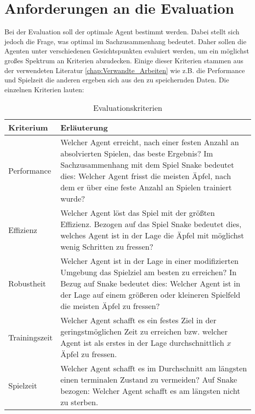 \section{Anforderungen an die Evaluation} \label{sec:Anforderungen_an_die_Evaluation}
Bei der Evaluation soll der optimale Agent bestimmt werden. Dabei stellt sich jedoch die Frage, was optimal im Sachzusammenhang bedeutet. 
Daher sollen die Agenten unter verschiedenen Gesichtspunkten evaluiert werden, um ein möglichst großes Spektrum an Kriterien abzudecken.
Einige dieser Kriterien stammen aus der verwendeten Literatur \ref{chap:Verwandte_Arbeiten} wie z.B. die Performance und Spielzeit die anderen ergeben sich aus den zu speichernden Daten.
Die einzelnen Kriterien lauten:
\begin{longtable}[h]{|p{4cm}|p{\linewidth - 5cm}|}
	\caption{Evaluationskriterien}
	\label{tab:Kriterien} 
	\endfirsthead
	\endhead
	\hline
	Kriterium & Erläuterung \\
	\hline
	Performance & Welcher Agent erreicht, nach einer festen Anzahl an absolvierten Spielen, das beste Ergebnis? Im Sachzusammenhang mit dem Spiel Snake bedeutet dies: Welcher Agent frisst die meisten Äpfel, nach dem er über eine feste Anzahl an Spielen trainiert wurde? \\
	\hline
	Effizienz & Welcher Agent löst das Spiel mit der größten Effizienz. Bezogen auf das Spiel Snake bedeutet dies, welches Agent ist in der Lage die Äpfel mit möglichst wenig Schritten zu fressen? \\
	\hline
	Robustheit & Welcher Agent ist in der Lage in einer modifizierten Umgebung das Spielziel am besten zu erreichen? In Bezug auf Snake bedeutet dies: Welcher Agent ist in der Lage auf einem größeren oder kleineren Spielfeld die meisten Äpfel zu fressen? \\
	\hline
	Trainingszeit & Welcher Agent schafft es ein festes Ziel in der geringstmöglichen Zeit zu erreichen bzw. welcher Agent ist als erstes in der Lage durchschnittlich $x$ Äpfel zu fressen. \\
	\hline
	Spielzeit & Welcher Agent schafft es im Durchschnitt am längsten einen terminalen Zustand zu vermeiden? Auf Snake bezogen: Welcher Agent schafft es am längsten nicht zu sterben. \\
	\hline
\end{longtable}